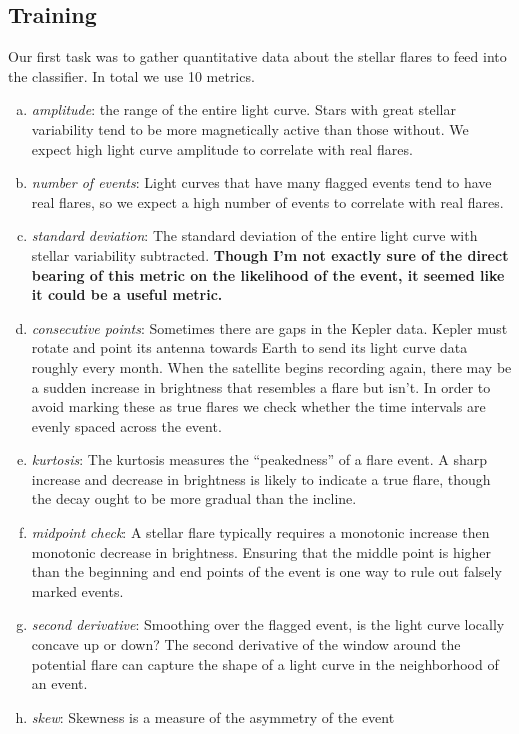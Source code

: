 \documentclass[11pt]{article}
\begin{document}
\subsection{Training}
\label{sec:train}
 Our first task was to gather quantitative data about the
stellar flares to feed into the classifier.  In total we use 10
metrics.
\begin{enumerate}[(a)]
\item \emph{amplitude}: the range of the entire light curve.  Stars
  with great stellar variability tend to be more magnetically active
  than those without.  We expect high light curve amplitude to
  correlate with real flares.
\item \emph{number of events}: Light curves that have many flagged
  events tend to have real flares, so we expect a high number of
  events to correlate with real flares.
\item \emph{standard deviation}: The standard deviation of the entire
  light curve with stellar variability subtracted.  \textbf{Though I'm
    not exactly sure of the direct bearing of this metric on the
    likelihood of the event, it seemed like it could be a useful
    metric.}
\item \emph{consecutive points}: Sometimes there are gaps in the
  Kepler data.  Kepler must rotate and point its antenna towards Earth
  to send its light curve data roughly every month.  When the
  satellite begins recording again, there may be a sudden increase in
  brightness that resembles a flare but isn't.  In order to avoid
  marking these as true flares we check whether the time intervals are
  evenly spaced across the event.
\item \emph{kurtosis}: The kurtosis measures the ``peakedness'' of a
  flare event.  A sharp increase and decrease in brightness is likely
  to indicate a true flare, though the decay ought to be more gradual
  than the incline.
\item \emph{midpoint check}: A stellar flare typically requires a
  monotonic increase then monotonic decrease in brightness.  Ensuring
  that the middle point is higher than the beginning and end points of
  the event is one way to rule out falsely marked events.
\item \emph{second derivative}: Smoothing over the flagged event, is
  the light curve locally concave up or down?  The second derivative
  of the window around the potential flare can capture the shape of a
  light curve in the neighborhood of an event.
\item \emph{skew}: Skewness is a measure of the asymmetry of the event

\end{enumerate}
\end{document}
